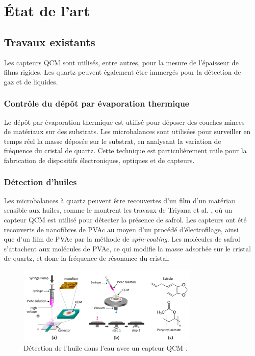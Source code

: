 \chapter{État de l'art}


\section{Travaux existants}

Les capteurs QCM sont utilisés, entre autres, pour la mesure de l'épaisseur de films rigides. Les quartz peuvent également être immergés pour la détection de gaz et de liquides.

\subsection{Contrôle du dépôt par évaporation thermique}

Le dépôt par évaporation thermique est utilisé pour déposer des couches minces de matériaux sur des substrats.  
Les microbalances sont utilisées pour surveiller en temps réel la masse déposée sur le substrat, en analysant la variation de fréquence du cristal de quartz.  
Cette technique est particulièrement utile pour la fabrication de dispositifs électroniques, optiques et de capteurs.


\subsection{Détection d'huiles}

Les microbalances à quartz peuvent être recouvertes d'un film d’un matériau sensible aux huiles,  
comme le montrent les travaux de Triyana et al. \cite{triyana2019highly}, où un capteur QCM est utilisé pour détecter la présence de safrol.  
Les capteurs ont été recouverts de nanofibres de PVAc au moyen d’un procédé d’électrofilage, ainsi que d’un film de PVAc par la méthode de \textit{spin-coating}.  
Les molécules de safrol s’attachent aux molécules de PVAc, ce qui modifie la masse adsorbée sur le cristal de quartz,  
et donc la fréquence de résonance du cristal.

\begin{figure}[H]
    \centering
    \includegraphics[width=0.8\textwidth]{assets/figures/Safrol Sensor.png}
    \caption{Détection de l'huile dans l'eau avec un capteur QCM \cite{triyana2019highly}.}
    \label{fig:Safrol_detection}
\end{figure}

